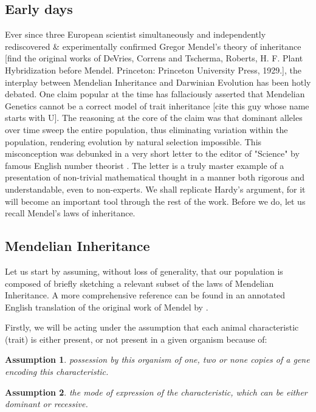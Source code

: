 \documentclass{l4proj}
\newtheorem{assum}{Assumption}
\begin{document}
\subsection{Early days}
Ever since three European scientist simultaneously and independently rediscovered \& experimentally confirmed Gregor Mendel's theory of inheritance [find the original works of DeVries, Correns and Tscherma, Roberts, H. F. Plant Hybridization before Mendel. Princeton: Princeton University Press, 1929.], the interplay between Mendelian Inheritance and Darwinian Evolution has been hotly debated. One claim popular at the time has fallaciously asserted that Mendelian Genetics cannot be a correct model of trait inheritance [cite this guy whose name starts with U]. The reasoning at the core of the claim was that dominant alleles over time sweep the entire population, thus eliminating variation within the population, rendering evolution by natural selection impossible. This misconception was debunked in a very short letter to the editor of "Science" by famous English number theorist \cite{hardy08}. The letter is a truly master example of a presentation of non-trivial mathematical thought in a manner both rigorous and understandable, even to non-experts. We shall replicate Hardy's argument, for it will become an important tool through the rest of the work. Before we do, let us recall Mendel's laws of inheritance.

\subsection{Mendelian Inheritance}

Let us start by assuming, without loss of generality, that our population is composed of  briefly sketching a relevant subset of the laws of Mendelian Inheritance. A more comprehensive reference can be found in an annotated English translation of the original work of Mendel by \cite{mendel}.

Firstly, we will be acting under the assumption that each animal characteristic (trait) is either present, or not present in a given organism because of:
\begin{assum}\label{genotypes}
  possession by this organism of one, two or none copies of a gene encoding this characteristic.
\end{assum}

\begin{assum}\label{dominance}
  the mode of expression of the characteristic, which can be either dominant or recessive.
\end{assum}
\end{document}
